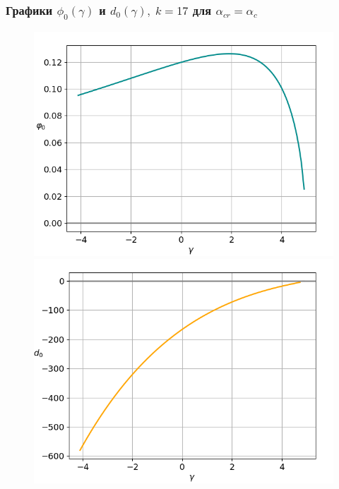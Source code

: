 \documentclass[fullscreen=true, unicode, bookmarks=false]{beamer}
\begin{document}
\begin{frame}
\frametitle{ Графики $ \phi_0(\gamma) $ и $ d_0(\gamma), \; k = 17 $ для $ \alpha_{cr}=\alpha_c $ }

\begin{figure} 
\begin{minipage}[h]{0.49\linewidth}
\begin{center}
\includegraphics[scale=0.37]{oscillating_phi0_033.png}
\end{center}
\end{minipage} 
\hfill
\begin{minipage}[h]{0.49\linewidth}
\begin{center}
\includegraphics[scale=0.37]{oscillating_d0_033.png} 
\end{center}
\end{minipage} 
\end{figure}

\end{frame}
\end{document}
